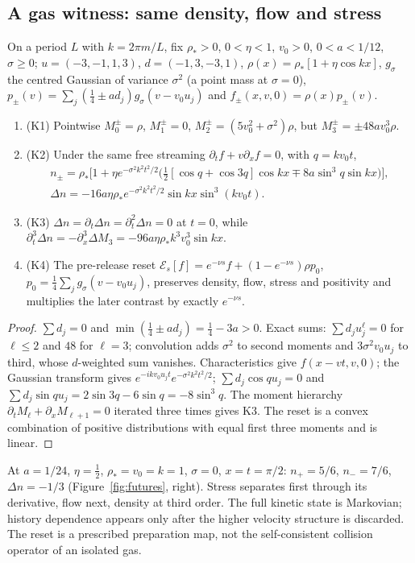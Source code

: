 \subsection{A gas witness: same density, flow and stress}
\begin{theorem}\label{thm:kinetic}
On a period $L$ with $k=2\pi m/L$, fix $\rho_*>0$, $0<\eta<1$, $v_0>0$, $0<a<1/12$, $\sigma\ge0$; $u=(-3,-1,1,3)$, $d=(-1,3,-3,1)$, $\rho(x)=\rho_*[1+\eta\cos kx]$, $g_\sigma$ the centred Gaussian of variance $\sigma^2$ (a point mass at $\sigma=0$), $p_\pm(v)=\sum_j(\tfrac14\pm ad_j)g_\sigma(v-v_0u_j)$ and $f_\pm(x,v,0)=\rho(x)p_\pm(v)$.
\begin{enumerate}
\item (K1) Pointwise $M_0^\pm=\rho$, $M_1^\pm=0$, $M_2^\pm=(5v_0^2+\sigma^2)\rho$, but $M_3^\pm=\pm48av_0^3\rho$.
\item (K2) Under the same free streaming $\partial_tf+v\partial_xf=0$, with $q=kv_0t$,
\begin{gather*}
n_\pm=\rho_*\big[1+\eta e^{-\sigma^2k^2t^2/2}\big(\tfrac12[\cos q+\cos3q]\cos kx\mp8a\sin^3q\sin kx\big)\big],\\
\Delta n=-16a\eta\rho_*e^{-\sigma^2k^2t^2/2}\sin kx\sin^3(kv_0t).
\end{gather*}
\item (K3) $\Delta n=\partial_t\Delta n=\partial_t^2\Delta n=0$ at $t=0$, while $\partial_t^3\Delta n=-\partial_x^3\Delta M_3=-96a\eta\rho_*k^3v_0^3\sin kx$.
\item (K4) The pre-release reset $\mathcal E_s[f]=e^{-\nu s}f+(1-e^{-\nu s})\rho p_0$, $p_0=\frac14\sum_jg_\sigma(v-v_0u_j)$, preserves density, flow, stress and positivity and multiplies the later contrast by exactly $e^{-\nu s}$. 
\end{enumerate}
\end{theorem}
\begin{proof}
$\sum d_j=0$ and $\min(\tfrac14\pm ad_j)=\tfrac14-3a>0$. Exact sums: $\sum d_ju_j^\ell=0$ for $\ell\le2$ and $48$ for $\ell=3$; convolution adds $\sigma^2$ to second moments and $3\sigma^2v_0u_j$ to third, whose $d$-weighted sum vanishes. Characteristics give $f(x-vt,v,0)$; the Gaussian transform gives $e^{-ikv_0u_jt}e^{-\sigma^2k^2t^2/2}$; $\sum d_j\cos qu_j=0$ and $\sum d_j\sin qu_j=2\sin3q-6\sin q=-8\sin^3q$. The moment hierarchy $\partial_tM_\ell+\partial_xM_{\ell+1}=0$ iterated three times gives K3. The reset is a convex combination of positive distributions with equal first three moments and is linear.
\end{proof}
At $a=1/24$, $\eta=\tfrac12$, $\rho_*=v_0=k=1$, $\sigma=0$, $x=t=\pi/2$: $n_+=5/6$, $n_-=7/6$, $\Delta n=-1/3$ (Figure~\ref{fig:futures}, right). Stress separates first through its derivative, flow next, density at third order. The full kinetic state is Markovian; history dependence appears only after the higher velocity structure is discarded. The reset is a prescribed preparation map, not the self-consistent collision operator of an isolated gas.

